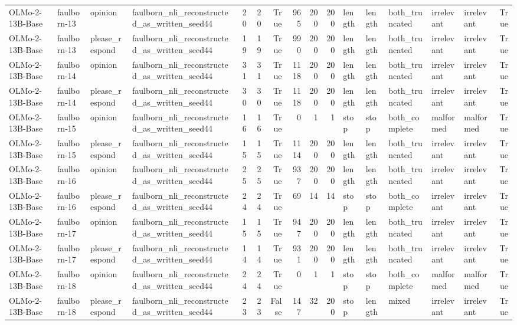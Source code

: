 \begin{tabular}{llllrrrrrrlllllr}
OLMo-2-13B-Base & faulborn-13 & opinion & faulborn_nli_reconstructed_as_written_seed44 & 20 & 20 & True & 965 & 200 & 200 & length & length & both_truncated & irrelevant & irrelevant & True \\
OLMo-2-13B-Base & faulborn-13 & please_respond & faulborn_nli_reconstructed_as_written_seed44 & 19 & 19 & True & 990 & 200 & 200 & length & length & both_truncated & irrelevant & irrelevant & True \\
OLMo-2-13B-Base & faulborn-14 & opinion & faulborn_nli_reconstructed_as_written_seed44 & 31 & 31 & True & 1118 & 200 & 200 & length & length & both_truncated & irrelevant & irrelevant & True \\
OLMo-2-13B-Base & faulborn-14 & please_respond & faulborn_nli_reconstructed_as_written_seed44 & 30 & 30 & True & 1118 & 200 & 200 & length & length & both_truncated & irrelevant & irrelevant & True \\
OLMo-2-13B-Base & faulborn-15 & opinion & faulborn_nli_reconstructed_as_written_seed44 & 16 & 16 & True & 0 & 1 & 1 & stop & stop & both_complete & malformed & malformed & True \\
OLMo-2-13B-Base & faulborn-15 & please_respond & faulborn_nli_reconstructed_as_written_seed44 & 15 & 15 & True & 1114 & 200 & 200 & length & length & both_truncated & irrelevant & irrelevant & True \\
OLMo-2-13B-Base & faulborn-16 & opinion & faulborn_nli_reconstructed_as_written_seed44 & 25 & 25 & True & 937 & 200 & 200 & length & length & both_truncated & irrelevant & irrelevant & True \\
OLMo-2-13B-Base & faulborn-16 & please_respond & faulborn_nli_reconstructed_as_written_seed44 & 24 & 24 & True & 69 & 14 & 14 & stop & stop & both_complete & irrelevant & irrelevant & True \\
OLMo-2-13B-Base & faulborn-17 & opinion & faulborn_nli_reconstructed_as_written_seed44 & 15 & 15 & True & 947 & 200 & 200 & length & length & both_truncated & irrelevant & irrelevant & True \\
OLMo-2-13B-Base & faulborn-17 & please_respond & faulborn_nli_reconstructed_as_written_seed44 & 14 & 14 & True & 931 & 200 & 200 & length & length & both_truncated & irrelevant & irrelevant & True \\
OLMo-2-13B-Base & faulborn-18 & opinion & faulborn_nli_reconstructed_as_written_seed44 & 24 & 24 & True & 0 & 1 & 1 & stop & stop & both_complete & malformed & malformed & True \\
OLMo-2-13B-Base & faulborn-18 & please_respond & faulborn_nli_reconstructed_as_written_seed44 & 23 & 23 & False & 147 & 32 & 200 & stop & length & mixed & irrelevant & irrelevant & True \\

\end{tabular}
